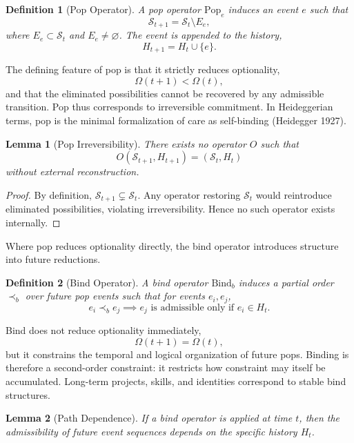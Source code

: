 \documentclass[11pt]{article}
\newtheorem{definition}{Definition}
\newtheorem{lemma}{Lemma}
\theoremstyle{remark}
\begin{document}
\begin{definition}[Pop Operator]
A pop operator $\mathrm{Pop}_e$ induces an event $e$ such that
\[
\mathcal{S}_{t+1} = \mathcal{S}_t \setminus E_e,
\]
where $E_e \subset \mathcal{S}_t$ and $E_e \neq \varnothing$. The event is appended to the history,
\[
H_{t+1} = H_t \cup \{e\}.
\]
\end{definition}

The defining feature of pop is that it strictly reduces optionality,
\[
\Omega(t+1) < \Omega(t),
\]
and that the eliminated possibilities cannot be recovered by any admissible transition. Pop thus corresponds to irreversible commitment. In Heideggerian terms, pop is the minimal formalization of care as self-binding (Heidegger 1927).

\begin{lemma}[Pop Irreversibility]
There exists no operator $O$ such that
\[
O(\mathcal{S}_{t+1}, H_{t+1}) = (\mathcal{S}_t, H_t)
\]
without external reconstruction.
\end{lemma}

\begin{proof}
By definition, $\mathcal{S}_{t+1} \subsetneq \mathcal{S}_t$. Any operator restoring $\mathcal{S}_t$ would reintroduce eliminated possibilities, violating irreversibility. Hence no such operator exists internally.
\end{proof}

Where pop reduces optionality directly, the bind operator introduces structure into future reductions.

\begin{definition}[Bind Operator]
A bind operator $\mathrm{Bind}_b$ induces a partial order $\prec_b$ over future pop events such that for events $e_i, e_j$,
\[
e_i \prec_b e_j \implies e_j \text{ is admissible only if } e_i \in H_t.
\]
\end{definition}

Bind does not reduce optionality immediately,
\[
\Omega(t+1) = \Omega(t),
\]
but it constrains the temporal and logical organization of future pops. Binding is therefore a second-order constraint: it restricts how constraint may itself be accumulated. Long-term projects, skills, and identities correspond to stable bind structures.

\begin{lemma}[Path Dependence]
If a bind operator is applied at time $t$, then the admissibility of future event sequences depends on the specific history $H_t$.
\end{lemma}
\end{document}

